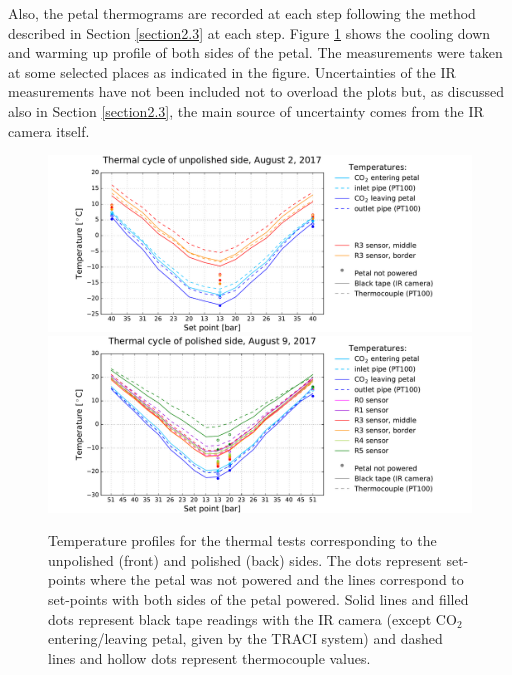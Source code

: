 		Also, the petal thermograms are recorded at each step following the method described in Section \ref{section2.3} at each step. Figure \ref{fig4.5} shows the cooling down and warming up profile of both sides of the petal. The measurements were taken at some selected places as indicated in the figure. Uncertainties of the IR measurements have not been included not to overload the plots but, as discussed also in Section \ref{section2.3}, the main source of uncertainty comes from the IR camera itself. 
		
		\begin{figure}[ht!]
			\centering
			\captionsetup{justification=centering,margin=0cm}
			\includegraphics[scale=0.45]{Figures/Chapter04/unwrapped_cycle_2_201711121522.pdf}
			\includegraphics[scale=0.45]{Figures/Chapter04/unwrapped_cycle_9_201711121522.pdf}
			\caption{Temperature profiles for the thermal tests corresponding to the unpolished (front) and polished (back) sides. The dots represent set-points where the petal was not powered and the lines correspond to set-points with both sides of the petal powered. Solid lines and filled dots represent black tape readings with the IR camera (except CO$_{2}$ entering/leaving petal, given by the TRACI system) and dashed lines and hollow dots represent thermocouple values.}\label{fig4.5}
		\end{figure}
		
